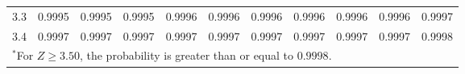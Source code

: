 \begin{table}[p]
\begin{center}
{\begin{tabular}{c | rrrrr | rrrrr |}
  3.3 & \footnotesize{0.9995} & \footnotesize{0.9995} & \footnotesize{0.9995} & \footnotesize{0.9996} & \footnotesize{0.9996} & \footnotesize{0.9996} & \footnotesize{0.9996} & \footnotesize{0.9996} & \footnotesize{0.9996} & \footnotesize{0.9997} \\
  3.4 & \footnotesize{0.9997} & \footnotesize{0.9997} & \footnotesize{0.9997} & \footnotesize{0.9997} & \footnotesize{0.9997} & \footnotesize{0.9997} & \footnotesize{0.9997} & \footnotesize{0.9997} & \footnotesize{0.9997} & \footnotesize{0.9998} \\
   \hline
\multicolumn{11}{l}{{\normalsize$^*$For $Z \geq 3.50$, the probability is greater than or equal to $0.9998$.}}
\end{tabular}}
\end{center}
\end{table}

